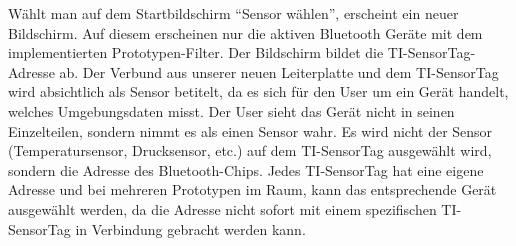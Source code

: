 Wählt man auf dem Startbildschirm ``Sensor wählen'', erscheint ein neuer Bildschirm. Auf diesem erscheinen nur die aktiven Bluetooth Geräte mit dem implementierten Prototypen-Filter. Der Bildschirm bildet die TI-SensorTag-Adresse ab. Der Verbund aus unserer neuen Leiterplatte und dem TI-SensorTag wird absichtlich als Sensor betitelt, da es sich für den User um ein Gerät handelt, welches Umgebungsdaten misst. Der User sieht das Gerät nicht in seinen Einzelteilen, sondern nimmt es als einen Sensor wahr. Es wird nicht der Sensor (Temperatursensor, Drucksensor, etc.) auf dem TI-SensorTag ausgewählt wird, sondern die Adresse des Bluetooth-Chips. Jedes TI-SensorTag hat eine eigene Adresse und bei mehreren Prototypen im Raum, kann das entsprechende Gerät ausgewählt werden, da die Adresse nicht sofort mit einem spezifischen TI-SensorTag in Verbindung gebracht werden kann.


